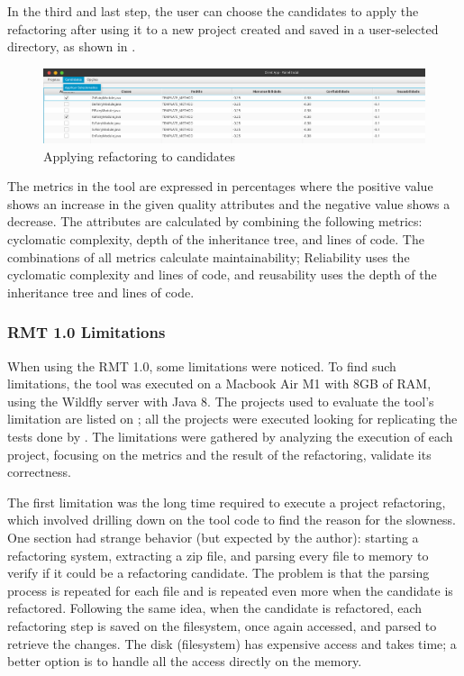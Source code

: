 In the third and last step, the user can choose the candidates to apply the refactoring after using it to a new project created and saved in a user-selected directory, as shown in .

\begin{figure}[ht!]
\SetCaptionWidth{\textwidth}
\caption{Applying refactoring to candidates}
\label{fig-refactor}
\includegraphics[width =\textwidth]{Chapter-2/Figures/refactor.png}
\end{figure}
\FloatBarrier

The metrics in the tool are expressed in percentages where the positive value shows an increase in the given quality attributes and the negative value shows a decrease. The attributes are calculated by combining the following metrics: cyclomatic complexity, depth of the inheritance tree, and lines of code. The combinations of all metrics calculate maintainability; Reliability uses the cyclomatic complexity and lines of code, and reusability uses the depth of the inheritance tree and lines of code. 

\subsubsection{RMT 1.0 Limitations}
\label{subsub-limitation}
When using the RMT 1.0, some limitations were noticed. To find such limitations, the tool was executed on a Macbook Air M1 with 8GB of RAM, using the Wildfly \cite{wildfly} server with Java 8. The projects used to evaluate the tool's limitation are listed on ; all the projects were executed looking for replicating the tests done by \textcite{beluzzo2018abordagem}. The limitations were gathered by analyzing the execution of each project, focusing on the metrics and the result of the refactoring, validate its correctness.

The first limitation was the long time required to execute a project refactoring, which involved drilling down on the tool code to find the reason for the slowness. One section had strange behavior (but expected by the author): starting a refactoring system, extracting a zip file, and parsing every file to memory to verify if it could be a refactoring candidate. The problem is that the parsing process is repeated for each file and is repeated even more when the candidate is refactored. Following the same idea, when the candidate is refactored, each refactoring step is saved on the filesystem, once again accessed, and parsed to retrieve the changes. The disk (filesystem) has expensive access and takes time; a better option is to handle all the access directly on the memory.

